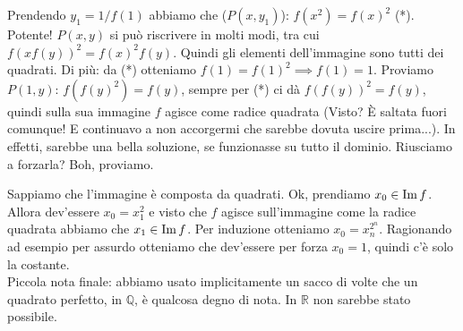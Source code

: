\begin{sol}
  Prendendo $y_1=1/f(1)$ abbiamo che ($P(x,y_1)$): $f(x^2)=f(x)^2$ (*). Potente! $P(x,y)$ si può riscrivere in molti modi, tra cui $f(xf(y))^2=f(x)^2f(y)$. Quindi gli elementi dell'immagine sono tutti dei quadrati. Di più: da (*) otteniamo $f(1)=f(1)^2 \implies f(1)=1$. Proviamo $P(1,y)$: $f(f(y)^2)=f(y)$, sempre per (*) ci dà $f(f(y))^2=f(y)$, quindi sulla sua immagine $f$ agisce come radice quadrata (Visto? È saltata fuori comunque! E continuavo a non accorgermi che sarebbe dovuta uscire prima...). In effetti, sarebbe una bella soluzione, se funzionasse su tutto il dominio. Riusciamo a forzarla? Boh, proviamo.

  Sappiamo che l'immagine è composta da quadrati. Ok, prendiamo $x_0 \in \operatorname{Im}{f}$. Allora dev'essere $x_0=x_1^2$ e visto che $f$ agisce sull'immagine come la radice quadrata abbiamo che $x_1 \in \operatorname{Im}{f}$. Per induzione otteniamo $x_0=x_n^{2^n}$. Ragionando ad esempio per assurdo otteniamo che dev'essere per forza $x_0=1$, quindi c'è solo la costante. \\

  Piccola nota finale: abbiamo usato implicitamente un sacco di volte che un quadrato perfetto, in $\mathbb{Q}$, è qualcosa degno di nota. In $\mathbb{R}$ non sarebbe stato possibile.
\end{sol}
